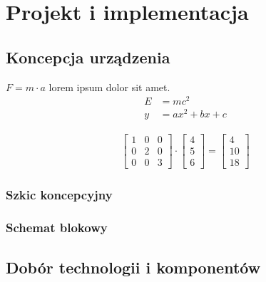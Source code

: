 \part{Projekt i implementacja}
\noindent \lipsum[1-3]

\clearpage\chapter{Koncepcja urządzenia}
    \noindent \lipsum[1-3] $F = m \cdot a$ lorem ipsum dolor sit amet.
    \begin{align}
        E & = mc^2 \\
        y & = ax^2 + bx + c
    \end{align}

    \lipsum[4-5]
    \begin{align}
        \begin{bmatrix}
            1 & 0 & 0 \\
            0 & 2 & 0 \\
            0 & 0 & 3
        \end{bmatrix} \cdot
        \begin{bmatrix}
            4 \\
            5 \\
            6
        \end{bmatrix} =
        \begin{bmatrix}
            4  \\
            10 \\
            18
        \end{bmatrix}
    \end{align}


    \section{Szkic koncepcyjny}
        \noindent \lipsum[6-7]

    \section{Schemat blokowy}
        \noindent \lipsum[8-9]

\clearpage\chapter{Dobór technologii i komponentów} 
    \noindent \lipsum[1-3]

